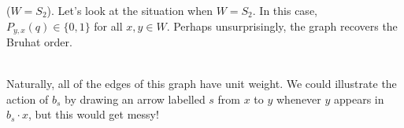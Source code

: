 \noindent\begin{example}\textup{($W = S_2$).} Let's look at the situation when $W = S_2$. In this case, $P_{y,x}(q) \in \{0, 1\}$ for all $x, y \in W$. Perhaps unsurprisingly, the graph recovers the Bruhat order.\\[-4\linespacing]
\begin{center}
\end{center}
\noindent\\[-3.5\linespacing] Naturally, all of the edges of this graph have unit weight. We could illustrate the action of $b_s$ by drawing an arrow labelled $s$ from $x$ to $y$ whenever $y$ appears in $b_s \cdot x$, but this would get messy!\\[\linespacing]
\end{example}


